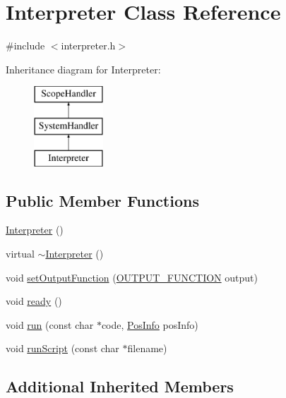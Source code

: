 \hypertarget{classInterpreter}{}\section{Interpreter Class Reference}
\label{classInterpreter}


{\ttfamily \#include $<$interpreter.\+h$>$}

Inheritance diagram for Interpreter\+:\begin{figure}[H]
\begin{center}
\leavevmode
\includegraphics[height=3.000000cm]{classInterpreter}
\end{center}
\end{figure}
\subsection*{Public Member Functions}
\begin{DoxyCompactItemize}
\item 
\hyperlink{classInterpreter_a9faf0dca72cd27223e5c447b580de2a5}{Interpreter} ()
\item 
virtual \hyperlink{classInterpreter_a462a2467300903e0188ac6e4a6a612f6}{$\sim$\+Interpreter} ()
\item 
void \hyperlink{classInterpreter_a3578606fb7dfe1705aee148a468a39a6}{set\+Output\+Function} (\hyperlink{interpreter_8h_a57e80eaa218fd4f66b1d55c833119967}{O\+U\+T\+P\+U\+T\+\_\+\+F\+U\+N\+C\+T\+I\+ON} output)
\item 
void \hyperlink{classInterpreter_ab51bbc767ecf73aca9137b1a78406e20}{ready} ()
\item 
void \hyperlink{classInterpreter_acd0f2550080bcf9c769da5e9b056d005}{run} (const char $\ast$code, \hyperlink{classPosInfo}{Pos\+Info} pos\+Info)
\item 
void \hyperlink{classInterpreter_a98b6ecfea24f94e180bd1853a39f0a12}{run\+Script} (const char $\ast$filename)
\end{DoxyCompactItemize}
\subsection*{Additional Inherited Members}


